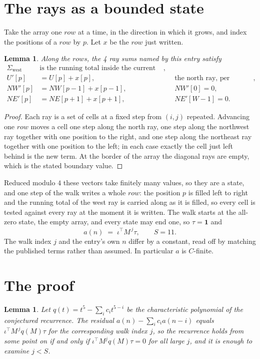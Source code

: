 \documentclass[11pt,a4paper]{article}
\theoremstyle{plain}
\newtheorem{lemma}[theorem]{Lemma}
\theoremstyle{definition}
\begin{document}
\section{The rays as a bounded state}

Take the array one $row$ at a time, in the direction in which it grows, and index the
positions of a $row $ by $p$. Let $x$ be the $row$ just written.

\begin{lemma}\label{lem:rays}
Along the $row$s, the 4 ray sums named by this entry satisfy
\[
\begin{aligned}
\Sigma_{\mathrm{west}}\ &\text{is the running total inside the current row},\\
U'[p]&=U[p]+x[p], &&\text{the north ray, per position},\\
NW'[p]&=NW[p-1]+x[p-1], && NW'[0]=0,\\
NE'[p]&=NE[p+1]+x[p+1], && NE'[W-1]=0 .
\end{aligned}
\]
\end{lemma}

\begin{proof}
Each ray is a set of cells at a fixed step from $(i,j)$ repeated. Advancing one $row$
moves a cell one step along the north ray, one step along the northwest ray together with one
position to the right, and one step along the northeast ray together with one position to the
left; in each case exactly the cell just left behind is the new term. At the border of the
array the diagonal rays are empty, which is the stated boundary value.
\end{proof}

Reduced modulo $4$ these vectors take finitely many values, so they are a state, and one step
of the walk writes a whole $row$: the position $p$ is filled left to right and the
running total of the west ray is carried along as it is filled, so every cell is tested
against every ray at the moment it is written. The walk starts at the all-zero state, the empty
array, and every state may end one, so $\tau=\mathbf{1}$ and
\[
a(n)\;=\;\iota^{\!\top}M^{\,j}\tau ,\qquad S=11.
\]
The walk index $j$ and the entry's own $n$ differ by a constant, read off by matching the
published terms rather than assumed. In particular $a$ is $C$-finite.

\section{The proof}

\begin{lemma}\label{lem:crit}
Let $q(t)=t^{5}-\sum_i c_it^{5-i}$ be the characteristic polynomial of the
conjectured recurrence. The residual $a(n)-\sum_ic_ia(n-i)$ equals
$\iota^{\!\top}M^{\,j}q(M)\tau$ for the corresponding walk index $j$, so the recurrence
holds from some point on if and only if $\iota^{\!\top}M^{j}q(M)\tau=0$ for all large $j$,
and it is enough to examine $j<S$.
\end{lemma}
\end{document}

